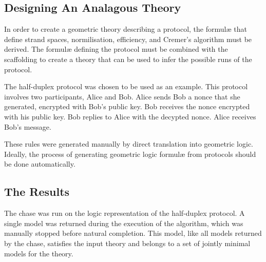 	\subsection{Designing An Analagous Theory}

		In order to create a geometric theory describing a protocol, the
		formul{\ae} that define strand spaces, normilisation, efficiency, and
		Cremer's algorithm must be derived. The formul{\ae} defining the
		protocol must be combined with the scaffolding to create a theory that
		can be used to infer the possible runs of the protocol.

		The half-duplex protocol was chosen to be used as an example.  This
		protocol involves two participants, Alice and Bob. Alice sends Bob a
		nonce that she generated, encrypted with Bob's public key. Bob receives
		the nonce encrypted with his public key. Bob replies to Alice with the
		decypted nonce. Alice receives Bob's message.

		These rules were generated manually by direct translation into
		geometric logic. Ideally, the process of generating geometric logic
		formul{\ae} from protocols should be done automatically.

	\subsection{The Results}

		The chase was run on the logic representation of the half-duplex protocol.
		A single model was returned during the execution of the algorithm,
		which was manually stopped before natural completion. This model, like
		all models returned by the chase, satisfies the input theory and
		belongs to a set of jointly minimal models for the theory.
